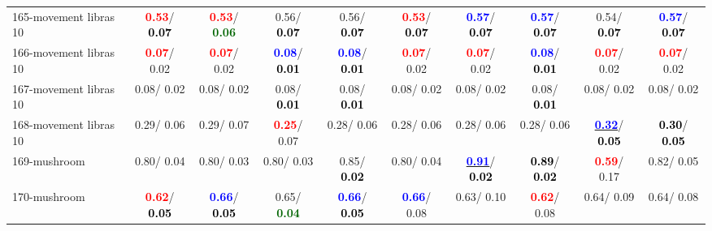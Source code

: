\begin{table}[h]
\begin{center}
{\begin{tabular}{lc|c|c|c|c|c|c|c|c}
165-movement libras 10 & \textcolor{red}{\textbf{  0.53}}/\textcolor{black}{\textbf{  0.07}} & \textcolor{red}{\textbf{  0.53}}/\textcolor{darkgreen}{\textbf{  0.06}} &   0.56/\textcolor{black}{\textbf{  0.07}} &   0.56/\textcolor{black}{\textbf{  0.07}} & \textcolor{red}{\textbf{  0.53}}/\textcolor{black}{\textbf{  0.07}} & \textcolor{blue}{\textbf{  0.57}}/\textcolor{black}{\textbf{  0.07}} & \textcolor{blue}{\textbf{  0.57}}/\textcolor{black}{\textbf{  0.07}} &   0.54/\textcolor{black}{\textbf{  0.07}} & \textcolor{blue}{\textbf{  0.57}}/\textcolor{black}{\textbf{  0.07}} \\
166-movement libras 10 & \textcolor{red}{\textbf{  0.07}}/  0.02 & \textcolor{red}{\textbf{  0.07}}/  0.02 & \textcolor{blue}{\textbf{  0.08}}/\textcolor{black}{\textbf{  0.01}} & \textcolor{blue}{\textbf{  0.08}}/\textcolor{black}{\textbf{  0.01}} & \textcolor{red}{\textbf{  0.07}}/  0.02 & \textcolor{red}{\textbf{  0.07}}/  0.02 & \textcolor{blue}{\textbf{  0.08}}/\textcolor{black}{\textbf{  0.01}} & \textcolor{red}{\textbf{  0.07}}/  0.02 & \textcolor{red}{\textbf{  0.07}}/  0.02 \\
167-movement libras 10 &   0.08/  0.02 &   0.08/  0.02 &   0.08/\textcolor{black}{\textbf{  0.01}} &   0.08/\textcolor{black}{\textbf{  0.01}} &   0.08/  0.02 &   0.08/  0.02 &   0.08/\textcolor{black}{\textbf{  0.01}} &   0.08/  0.02 &   0.08/  0.02 \\ \hline
168-movement libras 10 &   0.29/  0.06 &   0.29/  0.07 & \textcolor{red}{\textbf{  0.25}}/  0.07 &   0.28/  0.06 &   0.28/  0.06 &   0.28/  0.06 &   0.28/  0.06 & \underline{\textcolor{blue}{\textbf{  0.32}}}/\textcolor{black}{\textbf{  0.05}} & \textcolor{black}{\textbf{  0.30}}/\textcolor{black}{\textbf{  0.05}} \\
169-mushroom &   0.80/  0.04 &   0.80/  0.03 &   0.80/  0.03 &   0.85/\textcolor{black}{\textbf{  0.02}} &   0.80/  0.04 & \underline{\textcolor{blue}{\textbf{  0.91}}}/\textcolor{black}{\textbf{  0.02}} & \textcolor{black}{\textbf{  0.89}}/\textcolor{black}{\textbf{  0.02}} & \textcolor{red}{\textbf{  0.59}}/  0.17 &   0.82/  0.05 \\
170-mushroom & \textcolor{red}{\textbf{  0.62}}/\textcolor{black}{\textbf{  0.05}} & \textcolor{blue}{\textbf{  0.66}}/\textcolor{black}{\textbf{  0.05}} &   0.65/\textcolor{darkgreen}{\textbf{  0.04}} & \textcolor{blue}{\textbf{  0.66}}/\textcolor{black}{\textbf{  0.05}} & \textcolor{blue}{\textbf{  0.66}}/  0.08 &   0.63/  0.10 & \textcolor{red}{\textbf{  0.62}}/  0.08 &   0.64/  0.09 &   0.64/  0.08 \\

\end{tabular}}
\end{center}
\end{table}
